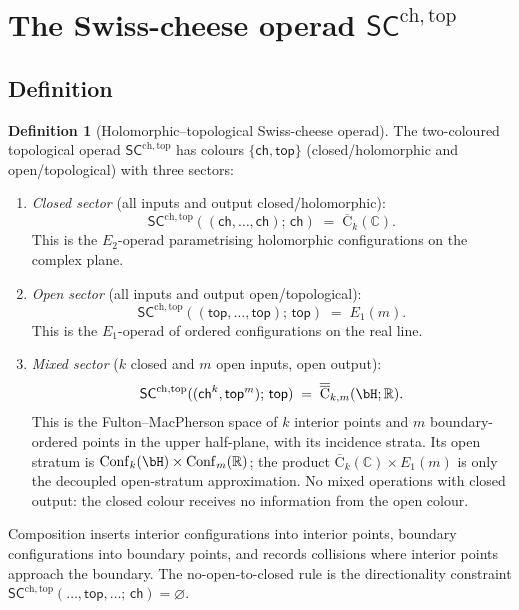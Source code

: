 \documentclass[11pt,reqno]{amsart}
\theoremstyle{definition}
\newtheorem{definition}[theorem]{Definition}
\theoremstyle{remark}
\providecommand{\FM}{\overline{\mathrm{C}}}
\providecommand{\Conf}{\mathrm{Conf}}
\providecommand{\Eone}{E_1}
\providecommand{\Etwo}{E_2}
\providecommand{\SCchtop}{\ensuremath{\mathsf{SC}^{\mathrm{ch,top}}}}
\providecommand{\bC}{\mathbb{C}}
\providecommand{\bR}{\mathbb{R}}
\begin{document}

\section{The Swiss-cheese operad $\SCchtop$}
\label{sec:sc-operad}

\subsection{Definition}

\begin{definition}[Holomorphic--topological Swiss-cheese operad]
\label{def:e-SC}
The two-coloured topological operad $\SCchtop$ has colours
$\{\mathsf{ch}, \mathsf{top}\}$ (closed/holomorphic and
open/topological) with three sectors:
\begin{enumerate}[label=\textup{(\roman*)}]
\item \emph{Closed sector} (all inputs and output
 closed/holomorphic):
 \[
 \SCchtop((\mathsf{ch},\ldots,\mathsf{ch});\,\mathsf{ch})
 \;=\; \FM_k(\bC).
 \]
 This is the $\Etwo$-operad parametrising holomorphic
 configurations on the complex plane.
\item \emph{Open sector} (all inputs and output
 open/topological):
 \[
 \SCchtop((\mathsf{top},\ldots,\mathsf{top});\,\mathsf{top})
 \;=\; \Eone(m).
 \]
 This is the $\Eone$-operad of ordered configurations on the
 real line.
\item \emph{Mixed sector} ($k$ closed and $m$ open inputs,
 open output):
 \[
 \SCchtop((\mathsf{ch}^k, \mathsf{top}^m);\,\mathsf{top})
 \;=\; \overline{\FM}_{k,m}(\bH;\bR).
 \]
 This is the Fulton--MacPherson space of \(k\) interior points and
 \(m\) boundary-ordered points in the upper half-plane, with its
 incidence strata. Its open stratum is
 \(\Conf_k(\bH)\times\Conf_m(\bR)\); the product
 \(\FM_k(\bC)\times\Eone(m)\) is only the decoupled open-stratum
 approximation.
 No mixed operations with closed output: the closed colour
 receives no information from the open colour.
\end{enumerate}
Composition inserts interior configurations into interior points,
boundary configurations into boundary points, and records collisions
where interior points approach the boundary. The no-open-to-closed rule
is the directionality constraint
$\SCchtop(\ldots,\mathsf{top},\ldots;\,\mathsf{ch})
= \varnothing$.
\end{definition}
\end{document}
